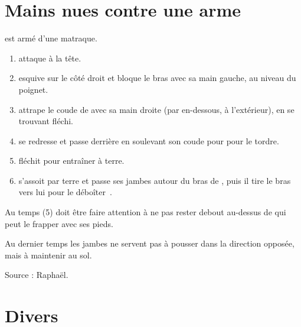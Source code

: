 \section{Mains nues contre une arme}


\begin{technique}

\A est armé d'une matraque.

\begin{enumerate}
	\item \A attaque \D à la tête.
	
	\item \D esquive sur le côté droit et bloque le bras avec sa main gauche, au niveau du poignet.
	
	\item \D attrape le coude de \A avec sa main droite (par en-dessous, à l'extérieur), en se trouvant fléchi.
	
	\item \D se redresse et passe derrière \A en soulevant son coude pour pour le tordre.
	
	\item \D fléchit pour entraîner \A à terre.
	
	\item \D s'assoit par terre et passe ses jambes autour du bras de \A, puis il tire le bras vers lui pour le déboîter~\footnotemark.
\end{enumerate}

Au temps (5) \D doit être faire attention à ne pas rester debout au-dessus de \A qui peut le frapper avec ses pieds.

Au dernier temps les jambes ne servent pas à pousser dans la direction opposée, mais à maintenir \A au sol.

Source : Raphaël.

\end{technique}


\section{Divers}


